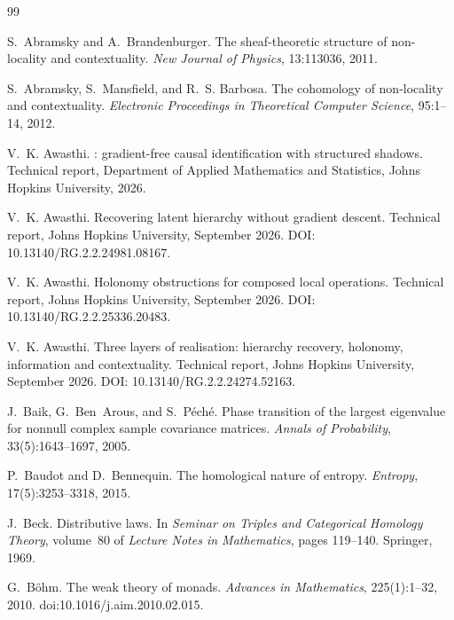 \documentclass[11pt]{article}
\theoremstyle{definition}
\theoremstyle{remark}
\begin{document}
\begin{thebibliography}{99}

S.~Abramsky and A.~Brandenburger.
\newblock The sheaf-theoretic structure of non-locality and contextuality.
\newblock \emph{New Journal of Physics}, 13:113036, 2011.

S.~Abramsky, S.~Mansfield, and R.~S. Barbosa.
\newblock The cohomology of non-locality and contextuality.
\newblock \emph{Electronic Proceedings in Theoretical Computer Science}, 95:1--14, 2012.

V.~K. Awasthi.
: gradient-free causal identification with structured shadows.
\newblock Technical report, Department of Applied Mathematics and Statistics, Johns Hopkins
  University, 2026.

V.~K. Awasthi.
\newblock Recovering latent hierarchy without gradient descent.
\newblock Technical report, Johns Hopkins University, September 2026.
\newblock DOI: 10.13140/RG.2.2.24981.08167.

V.~K. Awasthi.
\newblock Holonomy obstructions for composed local operations.
\newblock Technical report, Johns Hopkins University, September 2026.
\newblock DOI: 10.13140/RG.2.2.25336.20483.

V.~K. Awasthi.
\newblock Three layers of realisation: hierarchy recovery, holonomy, information and contextuality.
\newblock Technical report, Johns Hopkins University, September 2026.
\newblock DOI: 10.13140/RG.2.2.24274.52163.

J.~Baik, G.~Ben~Arous, and S.~P\'ech\'e.
\newblock Phase transition of the largest eigenvalue for nonnull complex sample covariance matrices.
\newblock \emph{Annals of Probability}, 33(5):1643--1697, 2005.

P.~Baudot and D.~Bennequin.
\newblock The homological nature of entropy.
\newblock \emph{Entropy}, 17(5):3253--3318, 2015.

J.~Beck.
\newblock Distributive laws.
\newblock In \emph{Seminar on Triples and Categorical Homology Theory}, volume~80 of \emph{Lecture
  Notes in Mathematics}, pages 119--140. Springer, 1969.

G.~B\"ohm.
\newblock The weak theory of monads.
\newblock \emph{Advances in Mathematics}, 225(1):1--32, 2010.
\newblock doi:10.1016/j.aim.2010.02.015.


\end{thebibliography}
\end{document}

